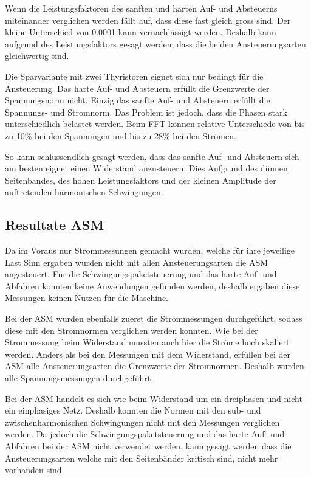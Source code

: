 Wenn die Leistungsfaktoren des sanften und harten Auf- und Absteuerns miteinander verglichen werden fällt auf, dass diese fast gleich gross sind. Der kleine Unterschied von 0.0001 kann vernachlässigt werden. Deshalb kann aufgrund des Leistungsfaktors gesagt werden, dass die beiden Ansteuerungsarten gleichwertig sind.

Die Sparvariante mit zwei Thyristoren eignet sich nur bedingt für die Ansteuerung. Das harte Auf- und Absteuern erfüllt die Grenzwerte der Spannungsnorm  nicht. Einzig das sanfte Auf- und Absteuern erfüllt die Spannungs- und Stromnorm. Das Problem ist jedoch, dass die Phasen stark unterschiedlich belastet werden. Beim FFT können relative Unterschiede von bis zu 10\% bei den Spannungen und bis zu 28\% bei den Strömen. 

So kann schlussendlich gesagt werden, dass das sanfte Auf- und Absteuern sich am besten eignet einen Widerstand anzusteuern. Dies Aufgrund des dünnen Seitenbandes, des hohen Leistungsfaktors und der kleinen Amplitude der auftretenden harmonischen Schwingungen.

\subsection{Resultate ASM}
Da im Voraus nur Strommessungen gemacht wurden, welche für ihre jeweilige Last Sinn ergaben wurden nicht mit allen Ansteuerungsarten die ASM angesteuert. Für die Schwingungspaketsteuerung und das harte Auf- und Abfahren konnten keine Anwendungen gefunden werden, deshalb ergaben diese Messungen keinen Nutzen für die Maschine.

Bei der ASM wurden ebenfalls zuerst die Strommessungen durchgeführt, sodass diese mit den Stromnormen verglichen werden konnten. Wie bei der Strommessung beim Widerstand mussten auch hier die Ströme hoch skaliert werden. Anders als bei den Messungen mit dem Widerstand, erfüllen bei der ASM alle Ansteuerungsarten die Grenzwerte der Stromnormen. Deshalb wurden alle Spannungsmessungen durchgeführt. 

Bei der ASM handelt es sich wie beim Widerstand um ein dreiphasen und nicht ein einphasiges Netz. Deshalb konnten die Normen mit den sub- und zwischenharmonischen Schwingungen nicht mit den Messungen verglichen werden. Da jedoch die Schwingungspaketsteuerung und das harte Auf- und Abfahren bei der ASM nicht verwendet werden, kann gesagt werden dass die Ansteuerungsarten welche mit den Seitenbänder kritisch sind, nicht mehr vorhanden sind. 

